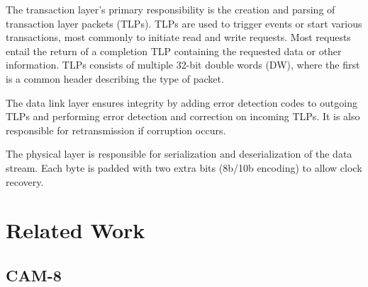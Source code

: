 The transaction layer's primary responsibility is the creation and parsing of transaction layer packets (TLPs).
TLPs are used to trigger events or start various transactions, most commonly to initiate read and write requests\footnotemark.
Most requests entail the return of a completion TLP containing the requested data or other information.
TLPs consists of multiple 32-bit double words (DW), where the first is a common header describing the type of packet.

The data link layer ensures integrity by adding error detection codes to outgoing TLPs and performing error detection and correction on incoming TLPs.
It is also responsible for retransmission if corruption occurs.

The physical layer is responsible for serialization and deserialization of the data stream.
Each byte is padded with two extra bits (8b/10b encoding) to allow clock recovery.

\section{Related Work}

\TODO

\subsection{CAM-8}

